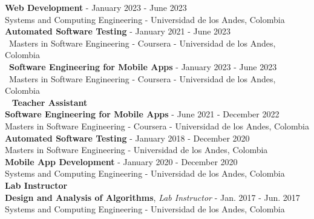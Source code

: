 \documentclass[letterpaper,11pt,oneside]{article}
\begin{document}
\indent \textbf{Web Development} -  January 2023 - June 2023\\
\indent Systems and Computing Engineering - Universidad de los Andes, Colombia \\
\indent \textbf{Automated Software Testing} -  January 2021 - June 2023\\
 \indent Masters in Software Engineering - Coursera - Universidad de los Andes, Colombia \\
 \indent \textbf{Software Engineering for Mobile Apps} -  January 2023 - June 2023\\
 \indent Masters in Software Engineering - Coursera - Universidad de los Andes, Colombia \vspace{0.2cm}\\ 
 \noindent \large{\textbf{Teacher Assistant}}\\
\indent \textbf{Software Engineering for Mobile Apps} - June 2021 - December 2022  \\
\indent Masters in Software Engineering - Coursera - Universidad de los Andes, Colombia \\
\indent \textbf{Automated Software Testing} - January 2018 - December 2020 \\
\indent Masters in Software Engineering - Universidad de los Andes, Colombia \\
\indent \textbf{Mobile App Development} - January 2020 - December 2020 \\
\indent Systems and Computing Engineering - Universidad de los Andes, Colombia \vspace{0.2cm}\\
\noindent \large{\textbf{Lab Instructor}}\\
\indent \textbf{Design and Analysis of Algorithms}, \textit{Lab Instructor} - Jan. 2017 - Jun. 2017 \\
\indent Systems and Computing Engineering - Universidad de los Andes, Colombia \\
\end{document}
